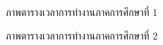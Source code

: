 \documentclass[12pt,oneside,openright,a4paper]{cpe-thai-project}
\begin{document}
\begin{landscape}
  \begin{figure}[ht]\centering
  \setlength{\fboxrule}{0.2mm} %
  \setlength{\fboxsep}{1cm}
  \caption{ภาพตารางเวลาการทำงานภาคการศึกษาที่ 1}\label{fig:system}
 \end{figure}
 \begin{figure}[ht]\centering
  \setlength{\fboxrule}{0.2mm} %
  \setlength{\fboxsep}{1cm}
  \caption{ภาพตารางเวลาการทำงานภาคการศึกษาที่ 2}\label{fig:system}
 \end{figure}
\end{landscape}
\end{document}
